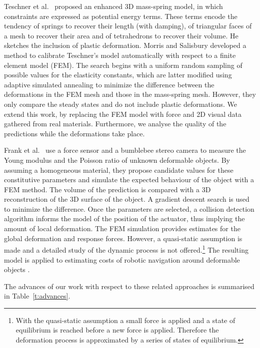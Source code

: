 \documentclass[journal]{IEEEtran}
\newcommand{\tref}[1]{Table~\ref{#1}}
\newcounter{algorithm}
\begin{document}
Teschner et al.\ \cite{Teschner2004} proposed an enhanced 3D mass-spring model, in which constraints are expressed as potential energy terms.  These terms encode the tendency of springs to recover their length (with damping), of triangular faces of a mesh to recover their area and of tetrahedrons to recover their volume.  He sketches the inclusion of plastic deformation.  Morris and Salisbury \cite{Morris2008} developed a method to calibrate Teschner's model automatically with respect to a finite element model (FEM).  The  search begins with a uniform random sampling of possible values for the elasticity constants, which are latter modified using adaptive simulated annealing to minimize the difference between the deformations in the FEM mesh and those in the mass-spring mesh.  However, they only compare the steady states and do not include plastic deformations.  We extend this work, by replacing the FEM model with force and 2D visual data gathered from real materials.  Furthermore, we analyse the quality of the predictions while the deformations take place.

Frank et al.\ \cite{Frank2010} use a force sensor and a bumblebee stereo camera to measure the Young modulus and the Poisson ratio of unknown deformable objects.  By assuming a homogeneous material, they propose candidate values for these constitutive parameters and simulate the expected behaviour of the object with a FEM method.  The volume of the prediction is compared with a 3D reconstruction of the 3D surface of the object.  A gradient descent search is used to minimize the difference.  Once the parameters are selected, a collision detection algorithm informs the model of the position of the actuator, thus implying the amount of local deformation.  The FEM simulation provides estimates for the global deformation and response forces.  However, a quasi-static assumption is made and a detailed study of the dynamic process is not offered.\footnote{With the quasi-static assumption a small force is applied and a state of equilibrium is reached before a new force is applied.  Therefore the deformation process is approximated 
by a series of states of equilibrium.}  The resulting model is applied to estimating costs of robotic navigation around deformable objects \cite{Frank2011}. 

The advances of our work with respect to these related approaches is summarised in \tref{t:advances}.
\end{document}
